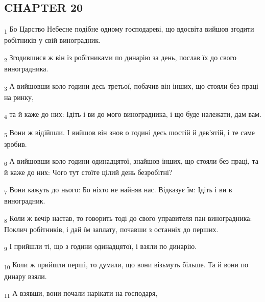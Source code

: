 \subsection{CHAPTER 20}
\begin{tcolorbox}
\textsubscript{1} Бо Царство Небесне подібне одному господареві, що вдосвіта вийшов згодити робітників у свій виноградник.
\end{tcolorbox}
\begin{tcolorbox}
\textsubscript{2} Згодившися ж він із робітниками по динарію за день, послав їх до свого виноградника.
\end{tcolorbox}
\begin{tcolorbox}
\textsubscript{3} А вийшовши коло години десь третьої, побачив він інших, що стояли без праці на ринку,
\end{tcolorbox}
\begin{tcolorbox}
\textsubscript{4} та й каже до них: Ідіть і ви до мого виноградника, і що буде належати, дам вам.
\end{tcolorbox}
\begin{tcolorbox}
\textsubscript{5} Вони ж відійшли. І вийшов він знов о годині десь шостій й дев'ятій, і те саме зробив.
\end{tcolorbox}
\begin{tcolorbox}
\textsubscript{6} А вийшовши коло години одинадцятої, знайшов інших, що стояли без праці, та й каже до них: Чого тут стоїте цілий день безробітні?
\end{tcolorbox}
\begin{tcolorbox}
\textsubscript{7} Вони кажуть до нього: Бо ніхто не найняв нас. Відказує їм: Ідіть і ви в виноградник.
\end{tcolorbox}
\begin{tcolorbox}
\textsubscript{8} Коли ж вечір настав, то говорить тоді до свого управителя пан виноградника: Поклич робітників, і дай їм заплату, почавши з останніх до перших.
\end{tcolorbox}
\begin{tcolorbox}
\textsubscript{9} І прийшли ті, що з години одинадцятої, і взяли по динарію.
\end{tcolorbox}
\begin{tcolorbox}
\textsubscript{10} Коли ж прийшли перші, то думали, що вони візьмуть більше. Та й вони по динару взяли.
\end{tcolorbox}
\begin{tcolorbox}
\textsubscript{11} А взявши, вони почали нарікати на господаря,
\end{tcolorbox}
